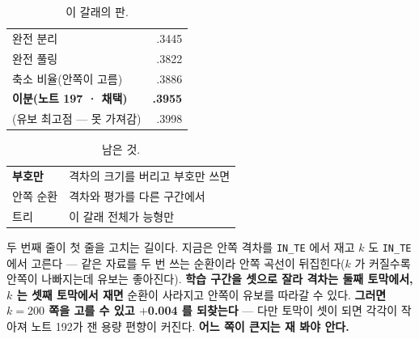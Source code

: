 \documentclass[10pt]{article}
\begin{document}


\begin{table}[t]
\centering\tsize
\caption{이 갈래의 판.}
\begin{tabular}{lr}
\toprule
완전 분리 & .3445 \\
완전 풀링 & .3822 \\
축소 비율(안쪽이 고름) & .3886 \\
\textbf{이분(노트 197 · 채택)} & \textbf{.3955} \\
(유보 최고점 --- 못 가져감) & .3998 \\
\bottomrule
\end{tabular}
\end{table}

\begin{table}[t]
\centering\tsize
\caption{남은 것.}
\begin{tabular}{ll}
\toprule
\textbf{부호만} & 격차의 크기를 버리고 부호만 쓰면 \\
안쪽 순환 & 격차와 평가를 다른 구간에서 \\
트리 & 이 갈래 전체가 능형만 \\
\bottomrule
\end{tabular}
\end{table}

두 번째 줄이 첫 줄을 고치는 길이다. 지금은 안쪽 격차를 \texttt{IN\_TE} 에서
재고 $k$ 도 \texttt{IN\_TE} 에서 고른다 --- 같은 자료를 두 번 쓰는 순환이라
안쪽 곡선이 뒤집힌다($k$ 가 커질수록 안쪽이 나빠지는데 유보는 좋아진다).
\textbf{학습 구간을 셋으로 잘라 격차는 둘째 토막에서, $k$ 는 셋째 토막에서
재면} 순환이 사라지고 안쪽이 유보를 따라갈 수 있다. \textbf{그러면 $k{=}200$
쪽을 고를 수 있고 $+$0.004 를 되찾는다} --- 다만 토막이 셋이 되면 각각이
작아져 노트 192가 잰 용량 편향이 커진다. \textbf{어느 쪽이 큰지는 재 봐야
안다.}
\end{document}
